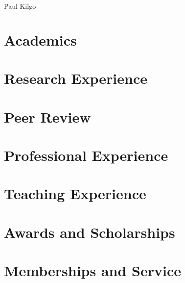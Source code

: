\documentclass[12pt,oldfontcommands]{memoir}
\begin{document}
\begin{center}
  \Huge{Paul Kilgo}
\end{center}
\thispagestyle{fancy}

\section*{Academics}


\section*{Research Experience}




\section*{Peer Review}


\section*{Professional Experience}


\section*{Teaching Experience}


\section*{Awards and Scholarships}


\section*{Memberships and Service}

\end{document}
